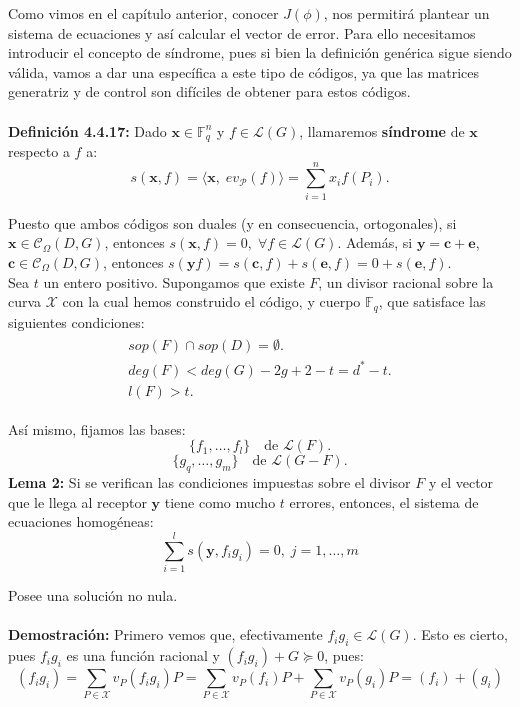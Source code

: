 \documentclass[11pt,spanish]{book}
\begin{document}
Como vimos en el capítulo anterior, conocer $J(\phi)$, nos permitirá plantear un sistema de ecuaciones y así calcular el vector de error. Para ello necesitamos introducir el concepto de síndrome, pues si bien la definición genérica sigue siendo válida, vamos a dar una específica a este tipo de códigos, ya que las matrices generatriz y de control son difíciles de obtener para estos códigos. \\
\\ \textbf{Definición 4.4.17: } Dado $\mathbf{x}\in\mathbb{F}_q^{n}$ y $f\in\mathcal{L}(G)$, llamaremos \textbf{síndrome} de $\mathbf{x}$ respecto a $f$ a:
$$s(\mathbf{x},f)=\langle \mathbf{x},\;ev_{\mathcal{P}}(f)\rangle = \sum _{i=1}^{n}x_{i}f(P_i).$$

Puesto que ambos códigos son duales (y en consecuencia, ortogonales), si $\mathbf{x}\in \mathcal{C}_{\Omega}(D,G)$, entonces $s(\mathbf{x},f)=0,\;\forall f\in\mathcal{L}(G)$. Además, si $\mathbf{y}=\mathbf{c}+\mathbf{e}$, $\mathbf{c}\in \mathcal{C}_{\Omega}(D,G)$, entonces $s(\mathbf{y} f)= s(\mathbf{c}, f)+s(\mathbf{e}, f)=0+s(\mathbf{e}, f)$.\\

Sea $t$ un entero positivo. Supongamos que existe $F$, un divisor racional sobre la curva $\mathbf{\mathcal{X}}$ con la cual hemos construido el código, y cuerpo $\mathbb{F}_q$, que satisface las siguientes \hypertarget{condicionesF}{condiciones:}
\begin{align}
\begin{split}
     sop(F)\cap sop(D)=\emptyset.\\
     deg(F)<deg(G)-2g+2-t=d^{*}-t.\\
     l(F)>t.
\end{split}
\end{align}

Así mismo, fijamos las bases:
$$\{f_1,\ldots,f_l\}\quad \text{de }\mathcal{L}(F).$$ 
$$\{g_q,\ldots, g_m\}\quad\text{de }\mathcal{L}(G-F).$$
\hypertarget{lemaSistemaSindromeAG}{\textbf{Lema 2: }} Si se verifican las condiciones impuestas sobre el divisor $F$ y el vector que le llega al receptor $\mathbf{y}$ tiene como mucho $t$ errores, entonces, el sistema de ecuaciones homogéneas:
$$\sum_{i=1}^{l}s(\mathbf{y},f_ig_i)=0,\;j=1,\ldots,m$$

Posee una solución no nula.\\
\\ \textbf{Demostración: } Primero vemos que, efectivamente $f_ig_i\in\mathcal{L}(G)$. Esto es cierto, pues $f_ig_i$ es una función racional y $(f_ig_i)+G\succeq 0$, pues:
$$(f_ig_i)=\sum_{P\in\mathbf{\mathcal{X}}}v_P(f_i g_i)P=\sum_{P\in\mathbf{\mathcal{X}}} v_P(f_i) P+\sum_{P\in\mathbf{\mathcal{X}}} v_P(g_i)P = (f_i)+(g_i)$$
\end{document}
